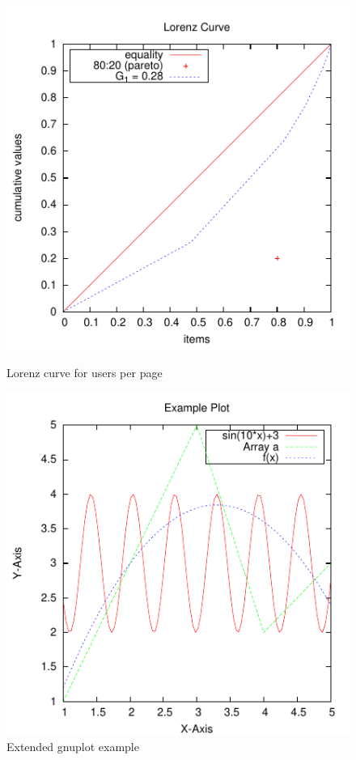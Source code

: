 \documentclass[a4paper]{scrartcl}
\begin{document}
\begin{figure}
  \parbox[b]{.5\textwidth}{%
  \includegraphics[width=\linewidth]{gp_lorenz}
  \caption{Lorenz curve for users per page}
  \label{fig:gp_lorenz}}\hfill
  \parbox[b]{.485\textwidth}{%
  \includegraphics[width=\linewidth]{gp_example}\vspace{1mm}
  \caption{Extended gnuplot example}
  \label{fig:gp_example}}
\end{figure}
\end{document}
